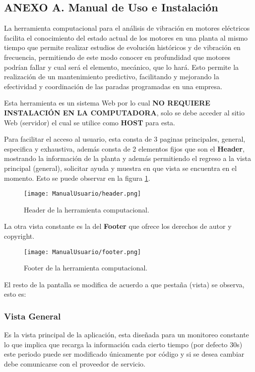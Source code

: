 \subsection{ANEXO A. Manual de Uso e Instalación}

La herramienta computacional para el análisis de vibración en motores eléctricos
facilita el conocimiento del estado actual de los motores en una planta al mismo
tiempo que permite realizar estudios de evolución históricos y de vibración en
frecuencia, permitiendo de este modo conocer en profundidad que motores podrían
fallar y cual será el elemento, mecánico, que lo hará. Esto permite la realización
de un mantenimiento predictivo, facilitando y mejorando la efectividad y
coordinación de las paradas programadas en una empresa.

Esta herramienta es un sistema Web por lo cual \textbf{NO REQUIERE INSTALACIÓN
EN LA COMPUTADORA}, solo se debe acceder al sitio Web (servidor) el cual se
utilice como \textbf{HOST} para esta.

Para facilitar el acceso al usuario, esta consta de 3 paginas principales,
general, especifica y exhaustiva, además consta de 2 elementos fijos que son el
\textbf{Header}, mostrando la información de la planta y además permitiendo
el regreso a la vista principal (general),  solicitar ayuda y muestra en que
vista se encuentra en el momento. Esto se puede observar en la figura
\ref{img:HeaderHerramienta}.

    \begin{figure}[H]
		\centering
        \caption{Header de la herramienta computacional. }
        \texttt{[image: ManualUsuario/header.png]}
        \label{img:HeaderHerramienta}
	\end{figure}

La otra vista constante es la del \textbf{Footer} que ofrece los derechos de autor
y copyright.

    \begin{figure}[H]
		\centering
        \caption{Footer de la herramienta computacional. }
        \texttt{[image: ManualUsuario/footer.png]}
        \label{img:FooterHerramienta}
	\end{figure}

El resto de la pantalla se modifica de acuerdo a que pestaña (vista) se observa,
esto es:

\subsubsection{Vista General}
Es la vista principal de la aplicación, esta diseñada para un monitoreo constante
lo que implica que recarga la información cada cierto tiempo (por defecto 30s)
este periodo puede ser modificado únicamente por código y si se desea cambiar debe
comunicarse con el proveedor de servicio.

